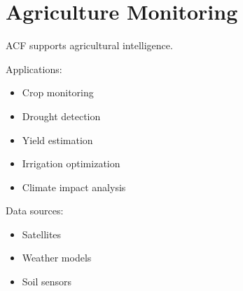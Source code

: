 \section{Agriculture Monitoring}


ACF supports agricultural intelligence.



Applications:


\begin{itemize}

\item Crop monitoring

\item Drought detection

\item Yield estimation

\item Irrigation optimization

\item Climate impact analysis

\end{itemize}



Data sources:


\begin{itemize}

\item Satellites

\item Weather models

\item Soil sensors

\end{itemize}
